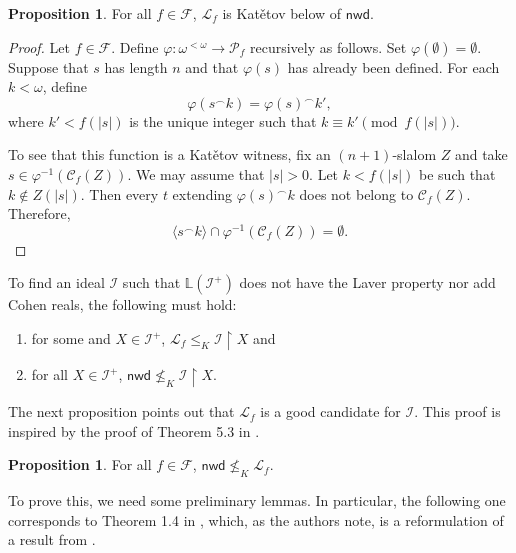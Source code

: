 \documentclass{amsart}
\theoremstyle{definition}
\newtheorem{proposition}[theorem]{Proposition}
\theoremstyle{remark}
\numberwithin{equation}{section}
\newcommand{\nwd}{\mathsf{nwd}}
\newcommand{\lf}{\mathcal{L}_f}
\newcommand{\li}{\mathbb{L}(\mathcal{I}^+)}
\newcommand{\lav}{\mathbb{L}}
\newcommand{\id}{\mathcal{I}}
\begin{document}


\begin{proposition}
    For all $f\in\mathcal{F}$, $\mathcal{L}_f$ is Kat\v{e}tov below of $\nwd$.
\end{proposition}

\begin{proof}
   Let $f \in \mathcal{F}$. Define $\varphi:\omega^{<\omega} \to \mathcal{P}_f$ recursively as follows. Set $\varphi(\emptyset)=\emptyset$. Suppose that $s$ has length $n$ and that $\varphi(s)$ has already been defined. For each $k<\omega$, define
\[
\varphi(s^\frown k)=\varphi(s)^\frown k',
\]
where $k' < f(|s|)$ is the unique integer such that $k \equiv k' \pmod{f(|s|)}$.

To see that this function is a Kat\v{e}tov witness, fix an $(n+1)$-slalom $Z$ and take $s \in \varphi^{-1}(\mathcal{C}_f(Z))$. We may assume that $|s|>0$. Let $k<f(|s|)$ be such that $k\notin Z(|s|)$. Then every $t$ extending $\varphi(s)^\frown k$ does not belong to $\mathcal{C}_f(Z)$. Therefore,
\[
\langle s^\frown k\rangle \cap \varphi^{-1}(\mathcal{C}_f(Z))=\emptyset.
\]    %
\end{proof}

To find an ideal $\id$ such that $\li$ does not have the Laver property nor add Cohen reals, the following must hold:
\begin{enumerate}
    \item for some and $X\in \id^+$, $\lf\leq_K \id\upharpoonright X$ and
    \item for all $X\in \id^+$, $\nwd\not\leq_K \id\upharpoonright X$.
\end{enumerate}

The next proposition points out that  $\lf$ is a good candidate for $\id$. This proof is inspired by the proof of Theorem 5.3 in \cite{fullmil}.

\begin{proposition}\label{nwd vs lf}
     For all $f\in \mathcal{F}$, $\nwd\not \leq_K \lf$.
\end{proposition}

To prove this, we need some preliminary lemmas. In particular, the following one corresponds to Theorem 1.4 in \cite{rationals}, which, as the authors note, is a reformulation of a result from \cite{Keremedis}.
\end{document}
